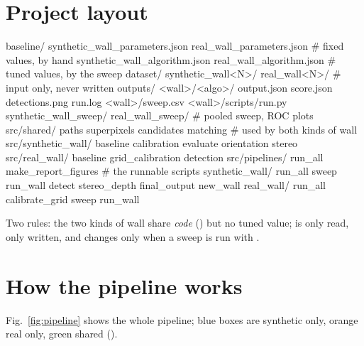 \documentclass[10pt,a4paper]{article}
\newcommand{\code}[1]{\leavevmode{\color{codename}\ttfamily #1}}
\begin{document}
\section{Project layout}
\label{sec:layout}
\begin{tree}
baseline/   synthetic_wall_parameters.json  real_wall_parameters.json   # fixed values, by hand
            synthetic_wall_algorithm.json   real_wall_algorithm.json    # tuned values, by the sweep
dataset/    synthetic_wall<N>/  real_wall<N>/                           # input only, never written
outputs/    <wall>/<algo>/  output.json score.json detections.png run.log
            <wall>/sweep.csv  <wall>/scripts/run.py
            synthetic_wall_sweep/  real_wall_sweep/                     # pooled sweep, ROC plots
src/shared/           paths superpixels candidates matching             # used by both kinds of wall
src/synthetic_wall/   baseline calibration evaluate orientation stereo
src/real_wall/        baseline grid_calibration detection
src/pipelines/        run_all make_report_figures                       # the runnable scripts
  synthetic_wall/     run_all sweep run_wall detect stereo_depth final_output new_wall
  real_wall/          run_all calibrate_grid sweep run_wall
\end{tree}
Two rules: the two kinds of wall share \emph{code} () but no tuned value;  is only
read,  only written, and  changes only when a sweep is run with \code{--save-best}.

\section{How the pipeline works}
\label{sec:flow}
Fig.~\ref{fig:pipeline} shows the whole pipeline; blue boxes are synthetic only, orange real only, green shared
().
\end{document}
